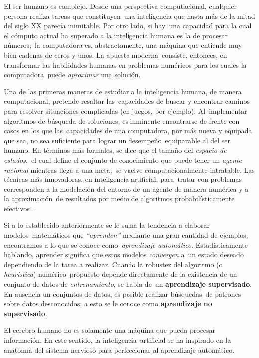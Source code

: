 \noindent
El ser humano es complejo. Desde una perspectiva computacional, cualquier persona realiza tareas que constituyen\
una inteligencia que hasta más de la mitad del siglo XX parecía inimitable. Por otro lado, si hay\
una capacidad para la cual el cómputo actual ha superado a la inteligencia humana es la de procesar números;\
la computadora es, abstractamente, una máquina que entiende muy bien cadenas de ceros y unos. La apuesta moderna\
consiste, entonces, en transformar las habilidades humanas en problemas numéricos para los cuales la computadora\
puede \emph{aproximar} una solución.\par
Una de las primeras maneras de estudiar a la inteligencia humana, de manera computacional, pretende resaltar las\
capacidades de buscar y encontrar caminos para resolver situaciones complicadas (en juegos, por ejemplo). Al\
implementar algoritmos de búsqueda de soluciones, es inminente encontrarse de frente con casos en los que las\
capacidades de una computadora, por más nueva y equipada que sea, no sea suficiente para lograr un desempeño\
equiparable al del ser humano. En términos más formales, se dice que el tamaño del \emph{espacio de estados},\
el cual define el conjunto de conocimiento que puede tener un \emph{agente racional} mientras llega a una meta,\
se vuelve computacionalmente intratable. Las técnicas más innovadoras, en inteligencia artificial, para\
tratar con problemas corresponden a la modelación del entorno de un agente de manera numérica y a la aproximación\
de resultados por medio de algoritmos probabilísticamente efectivos \cite{russell2010}.\par
Si a lo establecido anteriormente se le suma la tendencia a elaborar modelos\
matemáticos que \emph{``aprenden''} mediante una gran cantidad de ejemplos, encontramos a lo que se conoce como\
\emph{aprendizaje automático}. Estadísticamente hablando, aprender significa que estos modelos \emph{convergen} a\
un estado deseado dependiendo de la tarea a realizar. Cuando la robustez del algoritmo (o \emph{heurística}) numérico\
propuesto depende directamente de la existencia de un conjunto de datos de \emph{entrenamiento}, se habla de\
un \textbf{aprendizaje supervisado}. En ausencia un conjuntos de datos, es posible realizar búsquedas\
de patrones sobre datos desconocidos; a esto se le conoce como \textbf{aprendizaje no supervisado}.\par
El cerebro humano no es solamente una máquina que pueda procesar información. En este sentido, la inteligencia\
artificial se ha inspirado en la anatomía del sistema nervioso para perfeccionar al aprendizaje automático.\
